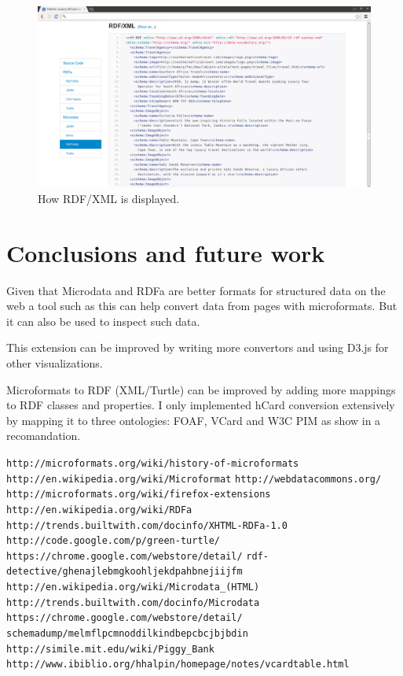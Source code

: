 \documentclass[12pt]{article}
\begin{document}
\begin{figure}[t!]
    \centering
    \includegraphics[width=13cm]{rdf-view}
    \caption{How RDF/XML is displayed.}
    \label{rdfView}
\end{figure}

\section{Conclusions and future work}

Given that Microdata and RDFa are better formats for structured data on the web
a tool such as this can help convert data from pages with microformats. But it
can also be used to inspect such data.

This extension can be improved by writing more convertors and using D3.js for
other visualizations.

Microformats to RDF (XML/Turtle) can be improved by adding more mappings to RDF
classes and properties. I only implemented hCard conversion extensively by
mapping it to three ontologies: FOAF, VCard and W3C PIM as show in a
recomandation\cite{mappings}.

\begin{thebibliography}{9}
     \texttt{http://microformats.org/wiki/history-of-microformats}
     \texttt{http://en.wikipedia.org/wiki/Microformat}
     \texttt{http://webdatacommons.org/}
     \texttt{http://microformats.org/wiki/firefox-extensions}
     \texttt{http://en.wikipedia.org/wiki/RDFa}
     \texttt{http://trends.builtwith.com/docinfo/XHTML-RDFa-1.0}
     \texttt{http://code.google.com/p/green-turtle/}
     \texttt{https://chrome.google.com/webstore/detail/}
        \texttt{rdf-detective/ghenajlebmgkoohljekdpahbnejiijfm}
     \texttt{http://en.wikipedia.org/wiki/Microdata\_(HTML)}
     \texttt{http://trends.builtwith.com/docinfo/Microdata}
     \texttt{https://chrome.google.com/webstore/detail/}
        \texttt{schemadump/melmflpcmnoddilkindbepcbcjbjbdin}
     \texttt{http://simile.mit.edu/wiki/Piggy\_Bank}
     \texttt{http://www.ibiblio.org/hhalpin/homepage/notes/vcardtable.html}
\end{thebibliography}
\end{document}
